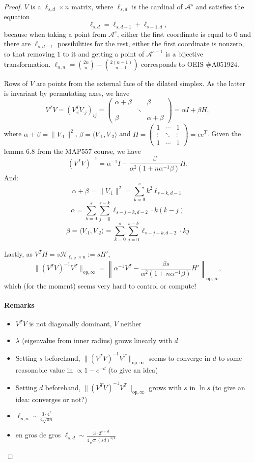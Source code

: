 \documentclass[oneside,english,a4paper]{amsart}
\numberwithin{equation}{section}
\numberwithin{figure}{section}
\theoremstyle{plain}
\theoremstyle{definition}
\theoremstyle{plain}
\theoremstyle{remark}
\theoremstyle{plain}
\theoremstyle{definition}
\theoremstyle{definition}
\begin{document}
\begin{proof}
$V$ is a $\ell_{s,d}\times n$ matrix, where $\ell_{s,d}$ is the cardinal
of $\mathcal{A}^{s}$ and satisfies the equation
\[
\ell_{s,d}=\ell_{s,d-1}+\ell_{s-1,d},
\]
because when taking a point from $\mathcal{A}^{s}$, either the first
coordinate is equal to $0$ and there are $\ell_{s,d-1}$ possibilities
for the rest, either the first coordinate is nonzero, so that removing
$1$ to it and getting a point of $\mathcal{A}^{s-1}$ is a bijective
transformation. $\ell_{n,n}=\binom{2n}{n}-\binom{2(n-1)}{n-1}$ corresponds
to OEIS \#A051924.

Rows of $V$ are points from the external face of the dilated simplex.
As the latter is invariant by permutating axes, we have
\[
V^{T}V=(V_{\cdot i}^{T}V_{\cdot j})_{ij}=\begin{pmatrix}\alpha+\beta &  & \beta\\
 & \ddots\\
\beta &  & \alpha+\beta
\end{pmatrix}=\alpha I+\beta H,
\]
where $\alpha+\beta=\lVert V_{\cdot1}\rVert^{2}$, $\beta=\langle V_{\cdot1},V_{\cdot2}\rangle$
and $H=\begin{pmatrix}1 & \cdots & 1\\
\vdots & \ddots & \vdots\\
1 & \cdots & 1
\end{pmatrix}=ee^{T}$. Given the lemma 6.8 from the MAP557 course, we have
\[
(V^{T}V)^{-1}=\alpha^{-1}I-\frac{\beta}{\alpha^{2}(1+n\alpha^{-1}\beta)}H.
\]
And:
\[\alpha+\beta=\lVert V_{\cdot1}\rVert^{2}=\sum_{k=0}^{s}k^{2}\ell_{s-k,d-1}\]
\[\alpha=\sum_{k=0}^{s}\sum_{j=0}^{s-k}\ell_{s-j-k,d-2}\cdot k(k-j)\]
\[\beta=\langle V_{\cdot1},V_{\cdot2}\rangle=\sum_{k=0}^{s}\sum_{j=0}^{s-k}\ell_{s-j-k,d-2}\cdot kj\]

Lastly, as $V^{T}H=s\mathcal{H}_{\ell_{s,d}\times n}:=sH'$,
\[
\lVert(V^{T}V)^{-1}V^{T}\rVert_{\text{op},\infty}=\left\lVert\alpha^{-1}V^{T}-\frac{\beta s}{\alpha^{2}(1+n\alpha^{-1}\beta)}H'\right\rVert_{\text{op},\infty},
\]
which (for the moment) seems very hard to control or compute!

\paragraph{Remarks}
\begin{itemize}
\item $V^{T}V$ is not diagonally dominant, $V$ neither
\item $\lambda$ (eigenvalue from inner radius) grows linearly with $d$
\item Setting $s$ beforehand, $\lVert(V^{T}V)^{-1}V^{T}\rVert_{\text{op},\infty}$
seems to converge in $d$ to some reasonable value in $\propto1-e^{-d}$
(to give an idea)
\item Setting $d$ beforehand, $\lVert(V^{T}V)^{-1}V^{T}\rVert_{\text{op},\infty}$
grows with $s$ in $\ln s$ (to give an idea: converges or not?)
\item $\ell_{n,n} \sim \frac{3\cdot 4^{n}}{4 \sqrt{\pi n}}$ 
\item en gros de gros $\ell_{s,d} \sim \frac{3\cdot 2^{s+d}}{4 \sqrt{\pi}(sd)^{1/4}}$ 
\end{itemize}
\end{proof}
\end{document}
